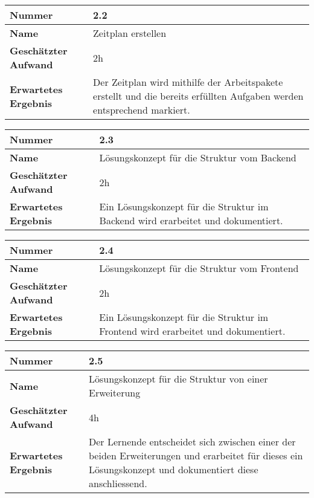 \begin{longtable}{p{}|p{}}
	\hline
	\textbf{Nummer}                 & \textbf{2.2}            \\
	\hline
	\textbf{Name}   				& Zeitplan erstellen                  \\
	\hline
	\textbf{Geschätzter Aufwand}    & 2h                                    \\
	\hline
	\textbf{Erwartetes Ergebnis}    & Der Zeitplan wird mithilfe der Arbeitspakete erstellt und die bereits erfüllten Aufgaben werden entsprechend markiert.                                    \\
	\hline
\end{longtable}\label{tab:planen-2.2}

\begin{longtable}{p{}|p{}}
	\hline
	\textbf{Nummer}                 & \textbf{2.3}            \\
	\hline
	\textbf{Name}   				& Lösungskonzept für die Struktur vom Backend                  \\
	\hline
	\textbf{Geschätzter Aufwand}    & 2h                                    \\
	\hline
	\textbf{Erwartetes Ergebnis}    & Ein Lösungskonzept für die Struktur im Backend wird erarbeitet und dokumentiert.                                    \\
	\hline
\end{longtable}\label{tab:planen-2.3}

\begin{longtable}{p{}|p{}}
	\hline
	\textbf{Nummer}                 & \textbf{2.4}            \\
	\hline
	\textbf{Name}   				& Lösungskonzept für die Struktur vom Frontend                  \\
	\hline
	\textbf{Geschätzter Aufwand}    & 2h                                    \\
	\hline
	\textbf{Erwartetes Ergebnis}    & Ein Lösungskonzept für die Struktur im Frontend wird erarbeitet und dokumentiert.                                    \\
	\hline
\end{longtable}\label{tab:planen-2.4}

\begin{longtable}{p{}|p{}}
	\hline
	\textbf{Nummer}                 & \textbf{2.5}            \\
	\hline
	\textbf{Name}   				& Lösungskonzept für die Struktur von einer Erweiterung                  \\
	\hline
	\textbf{Geschätzter Aufwand}    & 4h                                    \\
	\hline
	\textbf{Erwartetes Ergebnis}    & Der Lernende entscheidet sich zwischen einer der beiden Erweiterungen und erarbeitet für dieses ein Lösungskonzept und dokumentiert diese anschliessend.                                    \\
	\hline
\end{longtable}\label{tab:planen-2.5}

